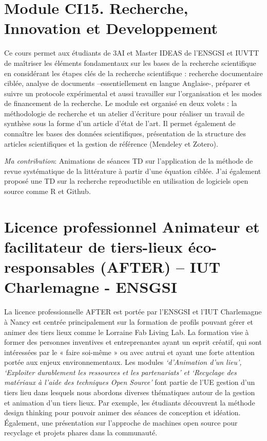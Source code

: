 \documentclass[
  12pt,
  oneside]{book}
\begin{document}
\hypertarget{module-ci15.-recherche-innovation-et-developpement}{%
\section{Module CI15. Recherche, Innovation et Developpement}\label{module-ci15.-recherche-innovation-et-developpement}}

Ce cours permet aux étudiants de 3AI et Master IDEAS de l'ENSGSI et IUVTT de maîtriser les éléments fondamentaux sur les bases de la recherche scientifique en considérant les étapes clés de la recherche scientifique : recherche documentaire ciblée, analyse de documents --essentiellement en langue Anglaise-, préparer et suivre un protocole expérimental et aussi travailler sur l'organisation et les modes de financement de la recherche.
Le module est organisé en deux volets : la méthodologie de recherche et un atelier d'écriture pour réaliser un travail de synthèse sous la forme d'un article d'état de l'art. Il permet également de connaître les bases des données scientifiques, présentation de la structure des articles scientifiques et la gestion de référence (Mendeley et Zotero).

\emph{Ma contribution}: Animations de séances TD sur l'application de la méthode de revue systématique de la littérature à partir d'une équation ciblée. J'ai également proposé une TD sur la recherche reproductible en utilisation de logiciels open source comme R et Github.

\hypertarget{licence-professionnel-animateur-et-facilitateur-de-tiers-lieux-uxe9co-responsables-after-iut-charlemagne---ensgsi}{%
\section{Licence professionnel Animateur et facilitateur de tiers-lieux éco-responsables (AFTER) -- IUT Charlemagne - ENSGSI}\label{licence-professionnel-animateur-et-facilitateur-de-tiers-lieux-uxe9co-responsables-after-iut-charlemagne---ensgsi}}

La licence professionnelle AFTER est portée par l'ENSGSI et l'IUT Charlemagne à Nancy est centrée principalement sur la formation de profils pouvant gérer et animer des tiers lieux comme le Lorraine Fab Living Lab. La formation vise à former des personnes inventives et entreprenantes ayant un esprit créatif, qui sont intéressées par le « faire soi-même » ou avec autrui et ayant une forte attention portée aux enjeux environnementaux.
Les modules \emph{`d'Animation d'un lieu', `Exploiter durablement les ressources et les partenariats' et `Recyclage des matériaux à l'aide des techniques Open Source'} font partie de l'UE gestion d'un tiers lieu dans lesquels nous abordons diverses thématiques autour de la gestion et animation d'un tiers lieux. Par exemple, les étudiants découvrent la méthode design thinking pour pouvoir animer des séances de conception et idéation.
Également, une présentation sur l'approche de machines open source pour recyclage et projets phares dans la communauté.
\end{document}
